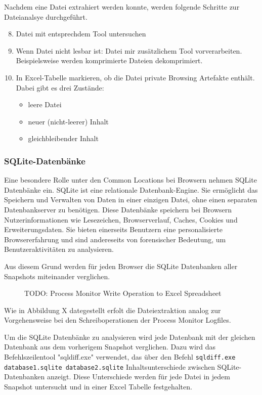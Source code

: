 Nachdem eine Datei extrahiert werden konnte, werden folgende Schritte zur Dateianalsye durchgeführt.
\begin{enumerate}
	\setcounter{enumi}{7}
	\item Datei mit entsprechdem Tool untersuchen 
	\item Wenn Datei nicht lesbar ist: Datei mir zusätzlichem Tool vorverarbeiten. Beispielsweise werden komprimierte Dateien dekomprimiert. 
	\item In Excel-Tabelle markieren, ob die Datei private Browsing Artefakte enthält. Dabei gibt es drei Zustände: 
	\begin{itemize}
	\item leere Datei
	\item neuer (nicht-leerer) Inhalt
	\item gleichbleibender Inhalt
	\end{itemize}		
\end{enumerate}


\subsubsection*{SQLite-Datenbänke}

Eine besondere Rolle unter den Common Locations bei Browsern nehmen SQLite Datenbänke ein. 
SQLite ist eine relationale Datenbank-Engine. Sie ermöglicht das Speichern und Verwalten von Daten in einer einzigen Datei, ohne einen separaten Datenbankserver zu benötigen.
Diese Datenbänke speichern bei Browsern Nutzerinformationen wie Lesezeichen, Browserverlauf, Caches, Cookies und Erweiterungsdaten. Sie bieten einerseits Benutzern eine personalisierte Browsererfahrung und sind andereseits von forensischer Bedeutung, um Benutzeraktivitäten zu analysieren.

Aus diesem Grund werden für jeden Browser die SQLite Datenbanken aller Snapshots miteinander verglichen. 
\begin{figure}[h!]
	\centering
	\small
	\centerline{\resizebox{\linewidth}{!}{}}
	\caption{TODO: Process Monitor Write Operation to Excel Spreadsheet}
	\label{fig:jes}
\end{figure}
Wie in Abbildung X dategestellt erfolt die Dateiextraktion analog zur Vorgehensweise bei den Schreiboperationen der Process Monitor Logfiles.

Um die SQLite Datenbänke zu analysieren wird jede Datenbank mit der gleichen Datenbank aus dem vorherigem Snapshot verglichen. Dazu wird das Befehlszeilentool "sqldiff.exe" verwendet, das über den Befehl \texttt{sqldiff.exe database1.sqlite database2.sqlite} Inhaltsunterschiede zwischen SQLite-Datenbanken anzeigt. Diese Unterschiede werden für jede Datei in jedem Snapshot untersucht und in einer Excel Tabelle festgehalten.

